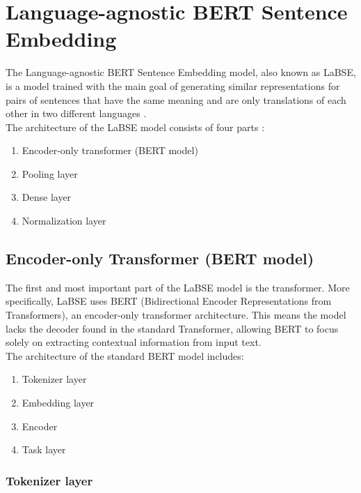 \section{Language-agnostic BERT Sentence Embedding}
\label{theoryLaBSE}

The Language-agnostic BERT Sentence Embedding model, also known as LaBSE, is a model trained with the main goal of generating similar representations for pairs of sentences that have the same meaning and are only translations of each other in two different languages \cite{labse_kaggle}.
\\

The architecture of the LaBSE model consists of four parts \cite{labse_hug}:

\begin{enumerate}
	\item Encoder-only transformer (BERT model)
	\item Pooling layer
	\item Dense layer
	\item Normalization layer
\end{enumerate}

\subsection{Encoder-only Transformer (BERT model)}
\label{emb:trans}

The first and most important part of the LaBSE model is the transformer. More specifically, LaBSE uses BERT (Bidirectional Encoder Representations from Transformers), an encoder-only transformer architecture. This means the model lacks the decoder found in the standard Transformer, allowing BERT to focus solely on extracting contextual information from input text.
\\

The architecture of the standard BERT model includes:

\begin{enumerate}
	\item Tokenizer layer
	\item Embedding layer
	\item Encoder
	\item Task layer
\end{enumerate}

\subsubsection{Tokenizer layer}

